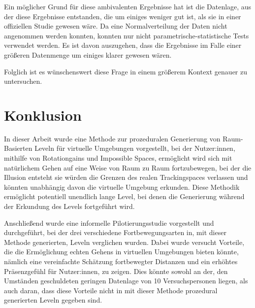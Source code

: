             Ein möglicher Grund für diese ambivalenten Ergebnisse hat ist die Datenlage, aus der diese Ergebnisse entstanden, die um einiges weniger gut ist, als sie in einer offiziellen Studie gewesen wäre. Da eine Normalverteilung der Daten nicht angenommen werden konnten, konnten nur nicht parametrische-statistische Tests verwendet werden.
            Es ist davon auszugehen, dass die Ergebnisse im Falle einer größeren Datenmenge um einiges klarer gewesen wären.

            Folglich ist es wünschenswert diese Frage in einem größerem Kontext genauer zu untersuchen.

    \section{Konklusion}
        In dieser Arbeit wurde eine Methode zur prozeduralen Generierung von Raum-Basierten Leveln für virtuelle Umgebungen vorgestellt, bei der  Nutzer:innen, mithilfe von Rotationgains und Impossible Spaces, ermöglicht wird sich mit natürlichem Gehen auf eine Weise von Raum zu Raum fortzubewegen, bei der die Illusion entsteht sie würden die Grenzen des realen Trackingspaces verlassen und könnten unabhängig davon die virtuelle Umgebung erkunden. Diese Methodik ermöglicht potentiell unendlich lange Level, bei denen die Generierung während der Erkundung des Levels fortgeführt wird.

        Anschließend wurde eine informelle Pilotierungsstudie vorgestellt und durchgeführt, bei der drei verschiedene Fortbewegungsarten in, mit dieser Methode generierten, Leveln verglichen wurden. Dabei wurde versucht Vorteile, die die Ermöglichung echten Gehens in virtuellen Umgebungen bieten könnte, nämlich eine vereinfachte Schätzung fortbewegter Distanzen und ein erhöhtes Präsenzgefühl für Nutzer:innen, zu zeigen. Dies könnte sowohl an der, den Umständen geschuldeten geringen Datenlage von 10 Versuchspersonen liegen, als auch daran, dass diese Vorteile nicht in mit dieser Methode prozedural generierten Leveln gegeben sind.



